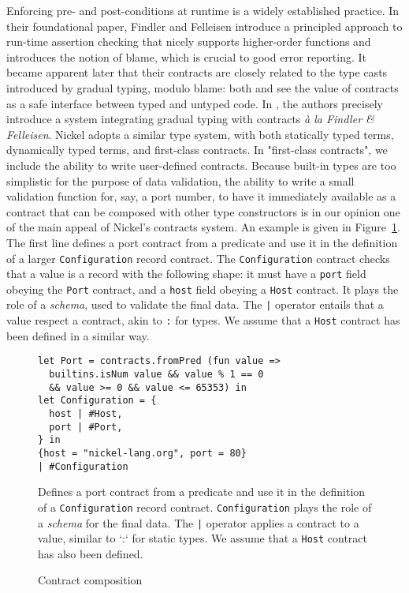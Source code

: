 \documentclass[sigplan,10pt,review,anonymous]{acmart}
\newcommand{\unsure}[2][1=]{}
\newcommand{\resolved}[2]{}
\begin{document}
Enforcing pre- and post-conditions at runtime is a widely established practice.
In their foundational paper\cite{FindlerFelleisenHOContracts}, Findler and
Felleisen introduce a principled approach to run-time assertion checking that
nicely supports higher-order functions and introduces the notion of blame, which
is crucial to good error reporting. It became apparent later that their
contracts are closely related to the type casts introduced by gradual typing,
modulo blame: both \cite{FindlerMultiLang} and \cite{FelleisenInterLang} see the
value of contracts as a safe interface between typed and untyped code. In
\cite{WellTypedBlamed}, the authors precisely introduce a system integrating
gradual typing with contracts \textit{à la Findler \& Felleisen}.\unsure{The
historical bit should probably be moved to related works eventually} Nickel
adopts a similar type system, with both statically typed terms, dynamically
typed terms, and first-class contracts. In "first-class contracts", we include
the ability to write user-defined contracts. Because built-in types are too
simplistic for the purpose of data validation, the ability to write a small
validation function for, say, a port number, to have it immediately available as
a contract that can be composed with other type constructors\resolved{Needs code
to illustrate.}, is in our opinion one of the main appeal of Nickel's contracts
system. An example is given in Figure~\ref{fig:contract-composition-appendix}. The first
line defines a port contract from a predicate and use it in the definition of a
larger \lstinline+Configuration+ record contract. The \lstinline+Configuration+
contract checks that a value is a record with the following shape: it must have
a \lstinline+port+ field obeying the \lstinline+Port+ contract, and a
\lstinline+host+ field obeying a \lstinline+Host+ contract. It plays the role of
a \emph{schema}, used to validate the final data. The \lstinline+|+ operator
entails that a value respect a contract, akin to \lstinline+:+ for types. We
assume that a \lstinline+Host+ contract has been defined in a similar way.

\begin{figure}
  \begin{center}
\begin{lstlisting}[language=nickel]
let Port = contracts.fromPred (fun value =>
  builtins.isNum value && value % 1 == 0
  && value >= 0 && value <= 65353) in
let Configuration = {
  host | #Host,
  port | #Port,
} in
{host = "nickel-lang.org", port = 80}
| #Configuration
\end{lstlisting}
  \end{center}
\caption{Contract composition}
\label{fig:contract-composition-appendix}
\medskip
\small
Defines a port contract from a predicate and use it in the definition of a
\lstinline+Configuration+ record contract. \lstinline+Configuration+ plays the
role of a \emph{schema} for the final data. The \lstinline+|+ operator applies a
contract to a value, similar to `:` for static types. We assume that a
\lstinline+Host+ contract has also been defined.
\end{figure}
\end{document}
